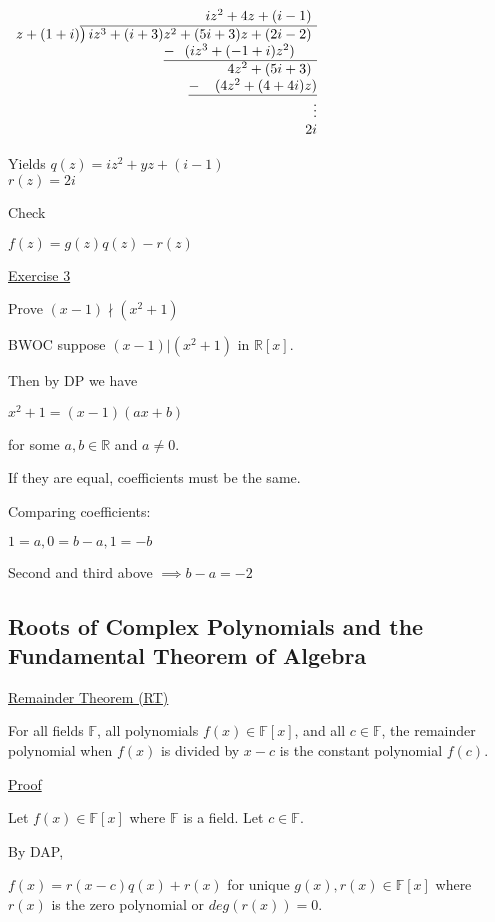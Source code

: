 \documentclass{article}
\begin{document}
$\begin{array}{r}
iz^2 + 4z + (i -1)\phantom{)}   \\
z + (1 + i){\overline{\smash{\big)}\,iz^3 + (i+3)z^2 + (5i + 3)z + (2i - 2)\phantom{)}}}\\
\underline{-~\phantom{(}(iz^3+(-1 + i)z^2)\phantom{-b)}}\\
4z^2 + (5i + 3)\phantom{)}\\ 
\underline{-~\phantom{()}(4z^2 + (4 + 4i)z)}\\ 
\vdots\\
2i
\end{array}$


Yields $q(z) = iz^2 + yz + (i -1)$\\
$r(z) = 2i$

Check

$f(z) = g(z)q(z) - r(z)$

\underline{Exercise 3}

Prove $(x-1) \nmid (x^2 + 1)$

BWOC suppose $(x-1) \vert (x^2 + 1)$ in $\mathbb{R}[x]$.

Then by DP we have

$x^2 + 1 = (x-1)(ax + b)$ 

for some $a,b \in \mathbb{R}$ and $a \ne 0$.

If they are equal, coefficients must be the same. 

Comparing coefficients:

$1= a, 0 = b-a, 1 = -b$

Second and third above $\implies b - a = -2$


\subsection{Roots of Complex Polynomials and the Fundamental Theorem of Algebra}

\underline{Remainder Theorem (RT)}

For all fields $\mathbb{F}$, all polynomials $f(x) \in \mathbb{F}[x]$, and all $c \in \mathbb{F}$, the remainder polynomial when $f(x)$ is divided by $x-c$ is the constant polynomial $f(c)$.

\underline{Proof}

Let $f(x) \in \mathbb{F}[x]$ where $\mathbb{F}$ is a field. Let $c \in \mathbb{F}$.

By DAP, 

$f(x) = r(x-c)q(x) + r(x)$ for unique $g(x),r(x) \in \mathbb{F}[x]$ where $r(x)$ is the zero polynomial or $deg(r(x)) = 0$.
\end{document}
